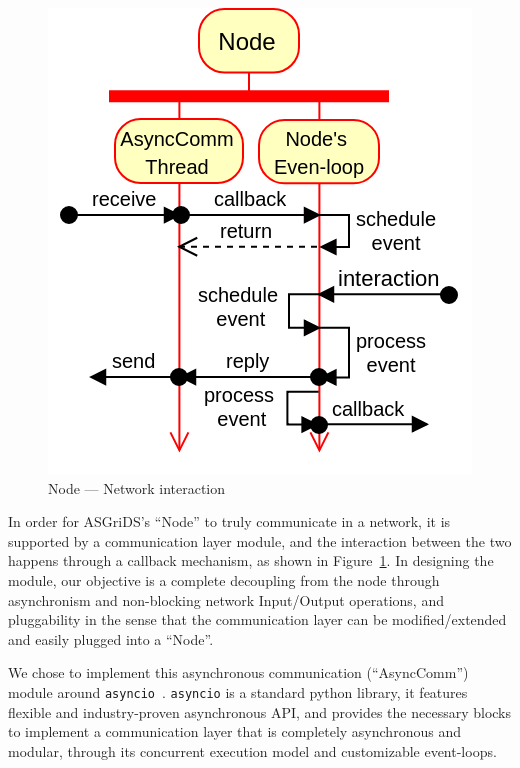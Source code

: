 \documentclass[conference]{IEEEtran}
\begin{document}
\begin{figure}[htp]
	\centering
	\includegraphics[width=.7\linewidth]{async_comm.png}
	\caption{Node --- Network interaction}
	\label{async_comm}
\end{figure}

In order for ASGriDS's ``Node'' to truly communicate in a network, it is supported by a communication layer module, and the interaction between the two happens through a callback mechanism, as shown in Figure~\ref{async_comm}.
In designing the module, our objective is a complete decoupling from the node through asynchronism and non-blocking network Input/Output operations, and pluggability in the sense that the communication layer can be modified/extended and easily plugged into a ``Node''.

We chose to implement this asynchronous communication (``AsyncComm'') module around \texttt{asyncio}~\cite{AsyncioAsynchronousPython}.
\texttt{asyncio} is a standard python library, it features flexible and industry-proven asynchronous API, and provides the necessary blocks to implement a communication layer that is completely asynchronous and modular, through its concurrent execution model and customizable event-loops.

\end{document}
